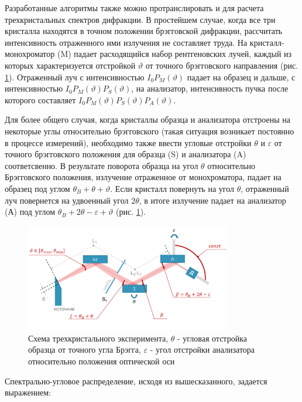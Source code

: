 Разработанные алгоритмы также можно протранслировать и для расчета трехкристальных спектров дифракции.
В простейшем случае, когда все три кристалла находятся в точном положении брэгговской дифракции, рассчитать
интенсивность отраженного ими излучения не составляет труда.
На кристалл-монохроматор (M) падает расходящийся набор рентгеновских лучей, каждый из которых характеризуется отстройкой
$\vartheta$ от точного брэгговского направления (рис. \ref{ris:triple_crystal_schem}). Отраженный луч с интенсивностью
$I_0 P_M(\vartheta)$ падает на образец и дальше, с интенсивностью $I_0 P_M(\vartheta)P_S(\vartheta)$,
  на анализатор, интенсивность пучка после которого составляет $I_0 P_M(\vartheta)P_S(\vartheta)P_A(\vartheta)$.

Для более общего случая, когда кристаллы образца и анализатора отстроены на некоторые углы относительно
брэгговского (такая ситуация возникает постоянно в процессе измерений),
необходимо также ввести угловые отстройки $\theta$ и $\varepsilon$ от точного брэгговского положения
для образца (S) и анализатора (A) соответсвенно.
В результате поворота образца на угол  $\theta$ относительно Брэгговского положения,
излучение отраженное от монохроматора, падает на образец
под углом $\theta_B+\theta+\vartheta$. Если кристалл повернуть на угол $\theta$,
 отраженный луч повернется на удвоенный угол
$2\theta$, в итоге излучение падает на анализатор (А) под углом $\theta_B+2\theta-\varepsilon+\vartheta$ \cite{trd_Bushuev_1997} (рис. \ref{ris:triple_crystal_schem}).
\begin{figure}[H]
  \centering
  \includegraphics[width=0.8\textwidth]{images/triple_crystal_schem.png}
  \caption{Схема трехкристального эксперимента, $\theta$ - угловая отстройка образца от точного угла Брэгга,
  $\varepsilon$ - угол отстройки анализатора относительно положения оптической оси}
  \label{ris:triple_crystal_schem}
\end{figure}

Спектрально-угловое распределение, исходя из вышесказанного, задается выражением:

